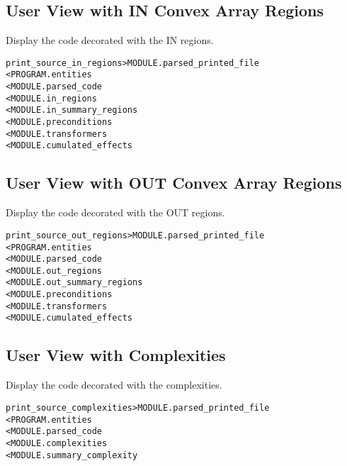 \documentclass[a4paper]{report}
\newenvironment{PipsMake}{\begin{alltt}}{\end{alltt}}
\newenvironment{PipsPass}[1]{\label{pass:#1}}{}
\begin{document}
\subsection{User View with IN Convex Array Regions}

\begin{PipsPass}{print_source_in_regions}
Display the code decorated with the IN regions.
\end{PipsPass}

\begin{PipsMake}
print_source_in_regions              > MODULE.parsed_printed_file
        < PROGRAM.entities
        < MODULE.parsed_code
        < MODULE.in_regions
        < MODULE.in_summary_regions
        < MODULE.preconditions
        < MODULE.transformers
        < MODULE.cumulated_effects
\end{PipsMake}

\subsection{User View with OUT Convex Array Regions}

\begin{PipsPass}{print_source_out_regions}
Display the code decorated with the OUT regions.
\end{PipsPass}

\begin{PipsMake}
print_source_out_regions              > MODULE.parsed_printed_file
        < PROGRAM.entities
        < MODULE.parsed_code
        < MODULE.out_regions
        < MODULE.out_summary_regions
        < MODULE.preconditions
        < MODULE.transformers
        < MODULE.cumulated_effects
\end{PipsMake}


\subsection{User View with Complexities}

\begin{PipsPass}{print_source_complexities}
Display the code decorated with the complexities.
\end{PipsPass}

\begin{PipsMake}
print_source_complexities         > MODULE.parsed_printed_file
        < PROGRAM.entities
        < MODULE.parsed_code
        < MODULE.complexities
        < MODULE.summary_complexity
\end{PipsMake}
\end{document}
